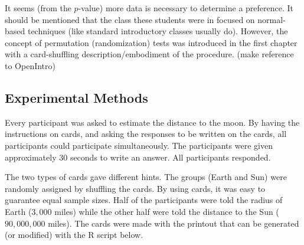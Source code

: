 \documentclass[]{article}
\begin{document}
It seems (from the \(p\)-value) more data is necessary to determine a
preference. It should be mentioned that the class these students were in
focused on normal-based techniques (like standard introductory classes
usually do). However, the concept of permutation (randomization) tests
was introduced in the first chapter with a card-shuffling
description/embodiment of the procedure. (make reference to OpenIntro)

\hypertarget{experimental-methods}{%
\subsection{Experimental Methods}\label{experimental-methods}}

Every participant was asked to estimate the distance to the moon. By
having the instructions on cards, and asking the responses to be written
on the cards, all participants could participate simultaneously. The
participants were given approximately 30 seconds to write an answer. All
participants responded.

The two types of cards gave different hints. The groups (Earth and Sun)
were randomly assigned by shuffling the cards. By using cards, it was
easy to guarantee equal sample sizes. Half of the participants were told
the radius of Earth (\(3,000\) miles) while the other half were told the
distance to the Sun (\(90,000,000\) miles). The cards were made with the
printout that can be generated (or modified) with the R script below.
\end{document}
